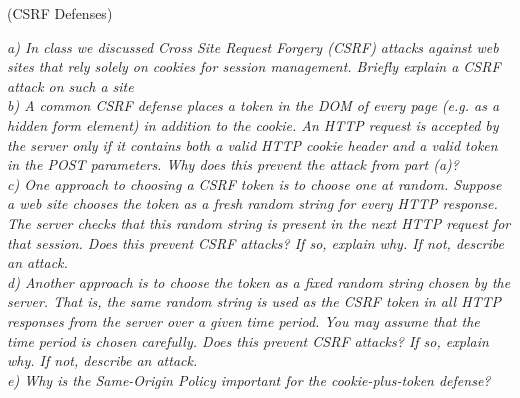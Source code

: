 \begin{prob}  (CSRF Defenses) 
\end{prob}

\noindent \textit{a) In class we discussed Cross Site Request Forgery (CSRF) attacks against web sites that rely solely on cookies for session management. Briefly explain a CSRF attack on such a site}\\

\noindent \textit{b) A common CSRF defense places a token in the DOM of every page (e.g. as a hidden form element) in addition to the cookie. An HTTP request is accepted by the server only if it contains both a valid HTTP cookie header and a valid token in the POST parameters. Why does this prevent the attack from part (a)?}\\

\noindent \textit{c) One approach to choosing a CSRF token is to choose one at random. Suppose a web site chooses the token as a fresh random string for every HTTP response. The server checks that this random string is present in the next HTTP request for that session. Does this prevent CSRF attacks? If so, explain why. If not, describe an attack.}\\

\noindent \textit{d) Another approach is to choose the token as a fixed random string chosen by the server. That is, the same random string is used as the CSRF token in all HTTP responses from the server over a given time period. You may assume that the time period is chosen carefully. Does this prevent CSRF attacks? If so, explain why. If not, describe an attack.}\\

\noindent \textit{e) Why is the Same-Origin Policy important for the cookie-plus-token defense?}\\
